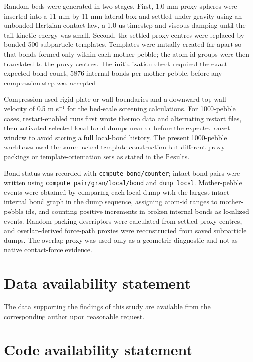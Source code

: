 \documentclass[10pt,twocolumn]{article}
\begin{document}
Random beds were generated in two stages. First, 1.0 mm proxy spheres were inserted into a 11 mm by 11 mm lateral box and settled under gravity using an unbonded Hertzian contact law, a 1.0 us timestep and viscous damping until the tail kinetic energy was small. Second, the settled proxy centres were replaced by bonded 500-subparticle templates. Templates were initially created far apart so that bonds formed only within each mother pebble; the atom-id groups were then translated to the proxy centres. The initialization check required the exact expected bond count, 5876 internal bonds per mother pebble, before any compression step was accepted.


Compression used rigid plate or wall boundaries and a downward top-wall velocity of 0.5 m s$^{-1}$ for the bed-scale screening calculations. For 1000-pebble cases, restart-enabled runs first wrote thermo data and alternating restart files, then activated selected local bond dumps near or before the expected onset window to avoid storing a full local-bond history. The present 1000-pebble workflows used the same locked-template construction but different proxy packings or template-orientation sets as stated in the Results.


Bond status was recorded with \texttt{compute bond/counter}; intact bond pairs were written using \texttt{compute pair/gran/local/bond} and \texttt{dump local}. Mother-pebble events were obtained by comparing each local dump with the largest intact internal bond graph in the dump sequence, assigning atom-id ranges to mother-pebble ids, and counting positive increments in broken internal bonds as localized events. Random packing descriptors were calculated from settled proxy centres, and overlap-derived force-path proxies were reconstructed from saved subparticle dumps. The overlap proxy was used only as a geometric diagnostic and not as native contact-force evidence.


\section{Data availability statement}

The data supporting the ﬁndings of this study are available from the corresponding author upon reasonable request.


\section{Code availability statement}
\end{document}
